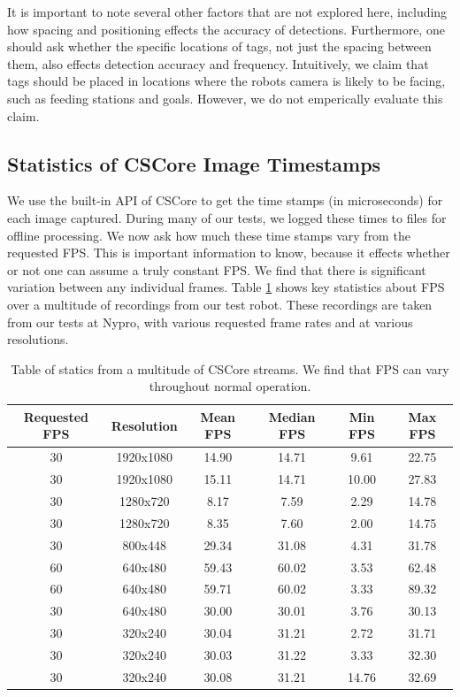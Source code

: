 \documentclass{article}
\begin{document}
    It is important to note several other factors that are not explored here, including how spacing and positioning effects the accuracy of detections. Furthermore, one should ask whether the specific locations of tags, not just the spacing between them, also effects detection accuracy and frequency. Intuitively, we claim that tags should be placed in locations where the robots camera is likely to be facing, such as feeding stations and goals. However, we do not emperically evaluate this claim.

	\subsection{Statistics of CSCore Image Timestamps}

    We use the built-in API of CSCore to get the time stamps (in microseconds) for each image captured. During many of our tests, we logged these times to files for offline processing. We now ask how much these time stamps vary from the requested FPS. This is important information to know, because it effects whether or not one can assume a truly constant FPS. We find that there is significant variation between any individual frames. Table \ref{table:fps_stats} shows key statistics about FPS over a multitude of recordings from our test robot. These recordings are taken from our tests at Nypro, with various requested frame rates and at various resolutions.

    \begin{table}[H]
      \centering
      \begin{tabular}{|c|c|c|c|c|c|} \hline
        Requested FPS & Resolution & Mean FPS & Median FPS & Min FPS & Max FPS \\ \hline
        30 & 1920x1080 & 14.90 & 14.71 & 9.61 & 22.75 \\ \hline
        30 & 1920x1080 & 15.11 & 14.71 & 10.00 & 27.83 \\ \hline
        30 & 1280x720 & 8.17 & 7.59 & 2.29 & 14.78 \\ \hline
        30 & 1280x720 & 8.35 & 7.60 & 2.00 & 14.75 \\ \hline
        30 & 800x448 & 29.34 & 31.08  & 4.31 & 31.78 \\ \hline
        60 & 640x480 & 59.43 & 60.02 & 3.53 & 62.48 \\ \hline
        60 & 640x480 & 59.71 & 60.02 & 3.33 & 89.32 \\ \hline
        30 & 640x480 & 30.00 & 30.01 & 3.76 & 30.13 \\ \hline
        30 & 320x240 & 30.04 & 31.21 & 2.72 & 31.71 \\ \hline
        30 & 320x240 & 30.03 & 31.22 & 3.33 & 32.30 \\ \hline
        30 & 320x240 & 30.08 & 31.21 & 14.76 & 32.69 \\ \hline
      \end{tabular}
      \caption{Table of statics from a multitude of CSCore streams. We find that FPS can vary throughout normal operation.}
      \label{table:fps_stats}
    \end{table}
\end{document}
